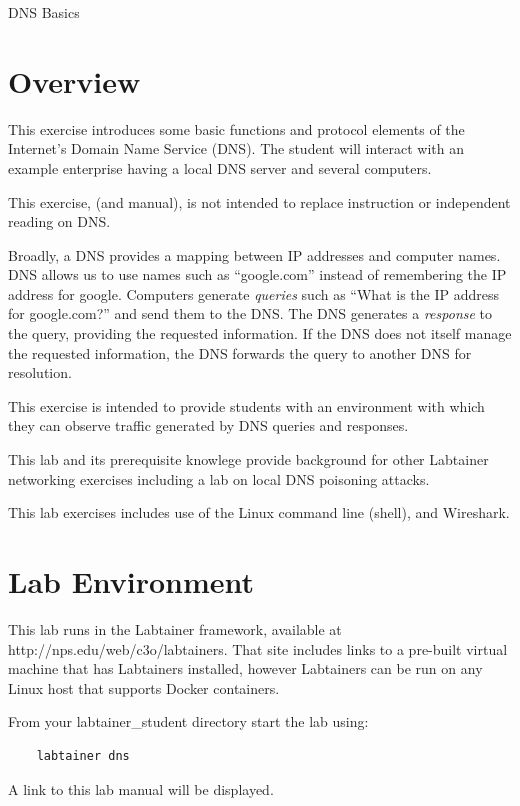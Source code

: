 


\begin{center}
{\LARGE DNS Basics}
\vspace{0.1in}\\
\end{center}

\section{Overview}
This exercise introduces some basic functions and protocol elements of the Internet's
Domain Name Service (DNS).  The student will interact with an example enterprise having a local 
DNS server and several computers.

This exercise, (and manual), is not intended to replace instruction
or independent reading on DNS.

Broadly, a DNS provides a mapping between IP addresses and computer names.  DNS allows us to use
names such as ``google.com'' instead of remembering the IP address for google.  Computers generate
\textit{queries} such as ``What is the IP address for google.com?'' and send them to the DNS.  The DNS
generates a \textit{response} to the query, providing the requested information.  If the DNS does not itself
manage the requested information, the DNS forwards the query to another DNS for resolution.

This exercise is intended to provide
students with an environment with which they can observe 
traffic generated by DNS queries and responses.

This lab and its prerequisite knowlege provide background for other Labtainer networking exercises 
including a lab on local DNS poisoning attacks.

This lab exercises includes use of the Linux command line (shell), and Wireshark.

\section{Lab Environment}
This lab runs in the Labtainer framework,
available at http://nps.edu/web/c3o/labtainers.
That site includes links to a pre-built virtual machine
that has Labtainers installed, however Labtainers can
be run on any Linux host that supports Docker containers.

From your labtainer_student directory start the lab using:
\begin{verbatim}
    labtainer dns
\end{verbatim}
\noindent A link to this lab manual will be displayed.  

